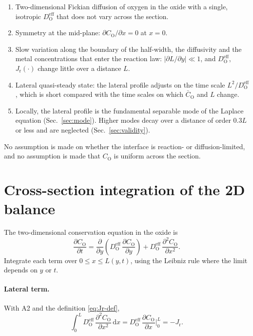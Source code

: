 \documentclass[12pt]{article}
\newcommand{\eff}{\mathrm{eff}}
\newcommand{\Ox}{\mathrm{O}}
\newcommand{\D}{D_{\Ox}^{\eff}}
\newcommand{\Cb}{\bar{C}_{\Ox}}
\newcommand{\Jr}{J_{\mathrm{r}}}
\newcommand{\dd}{\mathrm{d}}
\begin{document}
\begin{enumerate}
  \item[A1.] Two-dimensional Fickian diffusion of oxygen in the oxide with a single,
        isotropic $\D$ that does not vary across the section.
  \item[A2.] Symmetry at the mid-plane: $\partial C_{\Ox}/\partial x=0$ at $x=0$.
  \item[A3.] Slow variation along the boundary of the half-width, the diffusivity and
        the metal concentrations that enter the reaction law:
        $|\partial L/\partial y|\ll1$, and $\D$, $\Jr(\cdot)$ change little over a
        distance $L$.
  \item[A4.] Lateral quasi-steady state: the lateral profile adjusts on the time scale
        $L^2/\D$, which is short compared with the time scales on which $\Cb$ and $L$
        change.
  \item[A5.] Locally, the lateral profile is the fundamental separable mode of the
        Laplace equation (Sec.~\ref{sec:mode}). Higher modes decay over a distance
        of order $0.3L$ or less and are neglected (Sec.~\ref{sec:validity}).
\end{enumerate}
No assumption is made on whether the interface is reaction- or diffusion-limited, and
no assumption is made that $C_{\Ox}$ is uniform across the section.

\section{Cross-section integration of the 2D balance}
\label{sec:integration}

The two-dimensional conservation equation in the oxide is
\begin{equation}
\frac{\partial C_{\Ox}}{\partial t}
 =\frac{\partial}{\partial y}\!\left(\D\,\frac{\partial C_{\Ox}}{\partial y}\right)
 +\D\,\frac{\partial^2 C_{\Ox}}{\partial x^2}.
\label{eq:2d}
\end{equation}
Integrate each term over $0\le x\le L(y,t)$, using the Leibniz rule where the limit
depends on $y$ or $t$.

\paragraph{Lateral term.} With A2 and the definition \eqref{eq:Jr-def},
\begin{equation}
\int_{0}^{L}\D\,\frac{\partial^2 C_{\Ox}}{\partial x^2}\,\dd x
 =\D\,\frac{\partial C_{\Ox}}{\partial x}\bigg|_{0}^{L}
 =-\Jr .
\label{eq:int-lateral}
\end{equation}
\end{document}
